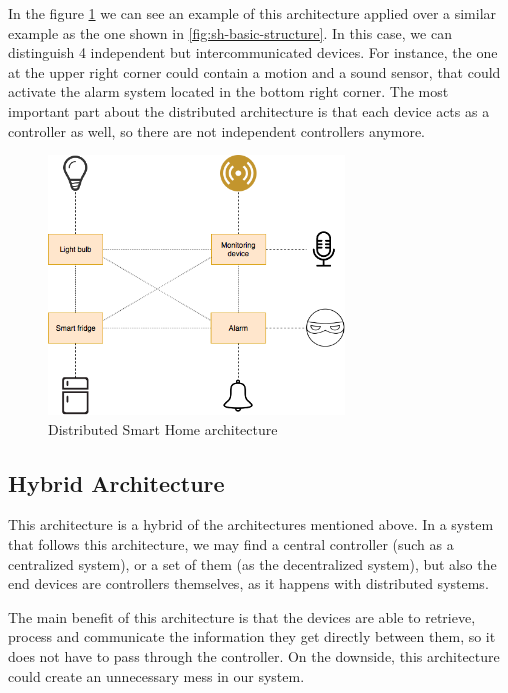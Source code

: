 In the figure \ref{fig:distributed-sh-architecture} we can see an example of this architecture applied over a similar example as the one
shown in \ref{fig:sh-basic-structure}. In this case, we can distinguish 4 independent but intercommunicated devices. For instance, 
the one at the upper right corner could contain a motion and a sound sensor, that could activate the alarm system located in the bottom
right corner. The most important part about the distributed architecture is that each device acts as a controller as well, so there are not
independent controllers anymore.

\begin{figure}
	\centering
	\includegraphics[width=0.7\textwidth]{images/Chapter_02/distributed-sh-architecture.png}
	\caption{Distributed Smart Home architecture}
	\label{fig:distributed-sh-architecture}
\end{figure}

\subsection{Hybrid Architecture}
This architecture is a hybrid of the architectures mentioned above. In a system that follows this architecture, we may find
a central controller (such as a centralized system), or a set of them (as the decentralized system), but also the end devices are
controllers themselves, as it happens with distributed systems.

The main benefit of this architecture is that the devices are able to retrieve, process and communicate the information they get
directly between them, so it does not have to pass through the controller. On the downside, this architecture could create an 
unnecessary mess in our system.



